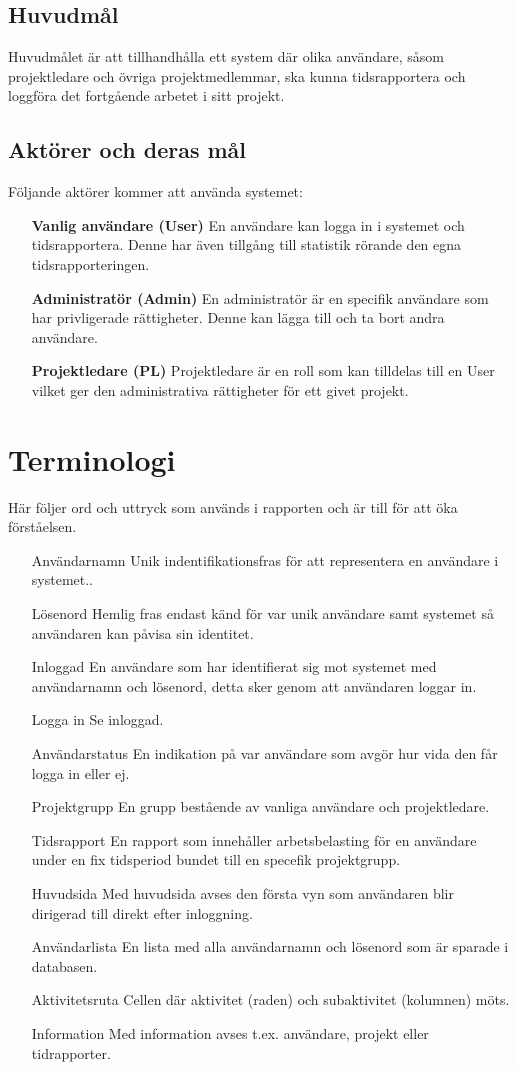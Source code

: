 \documentclass[a4paper]{article}
\begin{document}
\subsection{Huvudmål}
Huvudmålet är att tillhandhålla ett system där olika användare, såsom projektledare och övriga projektmedlemmar, ska kunna tidsrapportera och loggföra det fortgående arbetet i sitt projekt. 

\subsection{Aktörer och deras mål}
Följande aktörer kommer att använda systemet:
\begin{itemize}
\item [] \textbf{Vanlig användare (User)} En användare kan logga in i systemet och tidsrapportera. Denne har även tillgång till statistik rörande den egna tidsrapporteringen.
\item [] \textbf{Administratör (Admin)} En administratör är en specifik användare som har privligerade rättigheter. Denne kan lägga till och ta bort andra användare.
\item [] \textbf{Projektledare (PL)} Projektledare är en roll som kan tilldelas till en User vilket ger den administrativa rättigheter för ett givet projekt.
\end{itemize}

\section{Terminologi}
Här följer ord och uttryck som används i rapporten och är till för att öka förståelsen.
\begin{itemize}
\item [Användarnamn] Unik indentifikationsfras för att representera en användare i systemet..
\item [Lösenord] Hemlig fras endast känd för var unik användare samt systemet så användaren kan påvisa sin identitet.
\item [Inloggad] En användare som har identifierat sig mot systemet med användarnamn och lösenord, detta sker genom att användaren loggar in.
\item [Logga in] Se inloggad.
\item [Användarstatus] En indikation på var användare som avgör hur vida den får logga in eller ej.
\item [Projektgrupp] En grupp bestående av vanliga användare och projektledare.
\item [Tidsrapport] En rapport som innehåller arbetsbelasting för en användare under en fix tidsperiod bundet till en specefik projektgrupp.
\item [Huvudsida] Med huvudsida avses den första vyn som användaren blir dirigerad till direkt efter inloggning. 
\item [Användarlista] En lista med alla användarnamn och lösenord som är sparade i databasen.
\item [Aktivitetsruta] Cellen där aktivitet (raden) och subaktivitet (kolumnen) möts.
\item [Information] Med information avses t.ex. användare, projekt eller tidrapporter.
\end{itemize}
\end{document}
